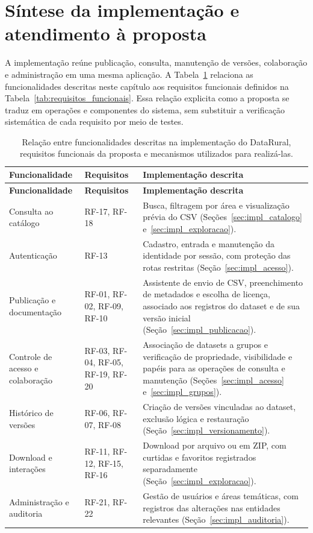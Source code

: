 \section{Síntese da implementação e atendimento à proposta}\label{sec:atendimento_proposta}

A implementação reúne publicação, consulta, manutenção de versões, colaboração e administração em uma mesma aplicação. A Tabela~\ref{tab:implementacao_requisitos} relaciona as funcionalidades descritas neste capítulo aos requisitos funcionais definidos na Tabela~\ref{tab:requisitos_funcionais}. Essa relação explicita como a proposta se traduz em operações e componentes do sistema, sem substituir a verificação sistemática de cada requisito por meio de testes.

\begin{longtable}{p{}p{}p{}}
\caption{Relação entre funcionalidades descritas na implementação do DataRural, requisitos funcionais da proposta e mecanismos utilizados para realizá-las.}\label{tab:implementacao_requisitos}\\
\toprule
\textbf{Funcionalidade} & \textbf{Requisitos} & \textbf{Implementação descrita} \\
\midrule
\endfirsthead
\toprule
\textbf{Funcionalidade} & \textbf{Requisitos} & \textbf{Implementação descrita} \\
\midrule
\endhead
Consulta ao catálogo & RF-17, RF-18 & Busca, filtragem por área e visualização prévia do CSV (Seções~\ref{sec:impl_catalogo} e~\ref{sec:impl_exploracao}). \\
Autenticação & RF-13 & Cadastro, entrada e manutenção da identidade por sessão, com proteção das rotas restritas (Seção~\ref{sec:impl_acesso}). \\
Publicação e documentação & RF-01, RF-02, RF-09, RF-10 & Assistente de envio de CSV, preenchimento de metadados e escolha de licença, associado aos registros do dataset e de sua versão inicial (Seção~\ref{sec:impl_publicacao}). \\
Controle de acesso e colaboração & RF-03, RF-04, RF-05, RF-19, RF-20 & Associação de datasets a grupos e verificação de propriedade, visibilidade e papéis para as operações de consulta e manutenção (Seções~\ref{sec:impl_acesso} e~\ref{sec:impl_grupos}). \\
Histórico de versões & RF-06, RF-07, RF-08 & Criação de versões vinculadas ao dataset, exclusão lógica e restauração (Seção~\ref{sec:impl_versionamento}). \\
Download e interações & RF-11, RF-12, RF-15, RF-16 & Download por arquivo ou em ZIP, com curtidas e favoritos registrados separadamente (Seção~\ref{sec:impl_exploracao}). \\
Administração e auditoria & RF-21, RF-22 & Gestão de usuários e áreas temáticas, com registros das alterações nas entidades relevantes (Seção~\ref{sec:impl_auditoria}). \\
\bottomrule
\end{longtable}

